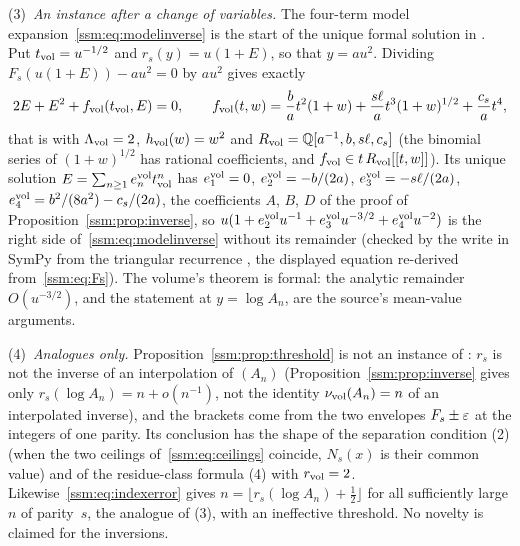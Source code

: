 \begin{remark}
(3)~\emph{An instance after a change of variables.} The four-term model
expansion~\eqref{ssm:eq:modelinverse} is the start of the unique formal
solution in . Put $t_{\rm vol}=u^{-1/2}$ and
$r_s(y)=u(1+E)$, so that $y=au^2$. Dividing $F_s(u(1+E))-au^2=0$ by $au^2$
gives exactly
\[
 2E+E^2+f_{\rm vol}(t_{\rm vol},E)=0,\qquad
 f_{\rm vol}(t,w)=\frac bat^2(1+w)+\frac{s\ell}at^3(1+w)^{1/2}+\frac{c_s}at^4,
\]
that is  with $\Lambda_{\rm vol}=2$,
$h_{\rm vol}(w)=w^2$ and
$R_{\rm vol}=\mathbb Q[a^{-1},b,s\ell,c_s]$ (the binomial series of
$(1+w)^{1/2}$ has rational coefficients, and $f_{\rm vol}\in
t\,R_{\rm vol}[[t,w]]$). Its unique solution
$E=\sum_{n\ge1}e_n^{\rm vol}t_{\rm vol}^n$ has
$e_1^{\rm vol}=0$, $e_2^{\rm vol}=-b/(2a)$, $e_3^{\rm vol}=-s\ell/(2a)$,
$e_4^{\rm vol}=b^2/(8a^2)-c_s/(2a)$, the coefficients $A$, $B$, $D$ of the
proof of Proposition~\ref{ssm:prop:inverse}, so
$u(1+e_2^{\rm vol}u^{-1}+e_3^{\rm vol}u^{-3/2}+e_4^{\rm vol}u^{-2})$ is the
right side of~\eqref{ssm:eq:modelinverse} without its remainder (checked by
the write in SymPy from the triangular recurrence
, the displayed equation re-derived
from~\eqref{ssm:eq:Fs}). The volume's theorem is formal: the analytic
remainder $O(u^{-3/2})$, and the statement at $y=\log A_n$, are the
source's mean-value arguments.

(4)~\emph{Analogues only.} Proposition~\ref{ssm:prop:threshold} is not an
instance of : $r_s$ is not the inverse of an
interpolation of $(A_n)$ (Proposition~\ref{ssm:prop:inverse} gives only
$r_s(\log A_n)=n+o(n^{-1})$, not the identity $\nu_{\rm vol}(A_n)=n$ of an
interpolated inverse), and the brackets come from the two
envelopes $F_s\pm\varepsilon$ at the integers of one parity. Its conclusion has the
shape of the separation condition (2) (when the two
ceilings of~\eqref{ssm:eq:ceilings} coincide, $N_s(x)$ is their common
value) and of the residue-class formula (4) with
$r_{\rm vol}=2$. Likewise~\eqref{ssm:eq:indexerror} gives
$n=\lfloor r_s(\log A_n)+\tfrac12\rfloor$ for all sufficiently large $n$ of
parity~$s$, the analogue of (3), with an
ineffective threshold. No novelty is claimed for the inversions.
\end{remark}
